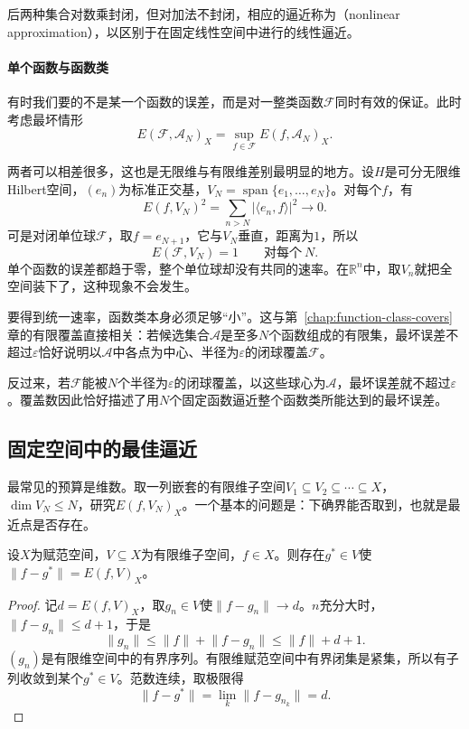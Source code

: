 后两种集合对数乘封闭，但对加法不封闭，相应的逼近称为（nonlinear approximation），以区别于在固定线性空间中进行的线性逼近。

\paragraph{单个函数与函数类}
有时我们要的不是某一个函数的误差，而是对一整类函数$\mathcal F$同时有效的保证。此时考虑最坏情形
\begin{equation}
 E(\mathcal F,\mathcal A_N)_X=\sup_{f\in\mathcal F}E(f,\mathcal A_N)_X .
 \label{eq:fapprox-worst-case}
\end{equation}

两者可以相差很多，这也是无限维与有限维差别最明显的地方。设$H$是可分无限维Hilbert空间，$(e_n)$为标准正交基，$V_N=\operatorname{span}\{e_1,\ldots,e_N\}$。对每个$f$，有
\[
 E(f,V_N)^2=\sum_{n>N}\lvert\langle e_n,f\rangle\rvert^2\to0 .
\]
可是对闭单位球$\mathcal F$，取$f=e_{N+1}$，它与$V_N$垂直，距离为$1$，所以
\[
 E(\mathcal F,V_N)=1\qquad\text{对每个}\ N.
\]
单个函数的误差都趋于零，整个单位球却没有共同的速率。在$\mathbb R^n$中，取$V_n$就把全空间装下了，这种现象不会发生。

要得到统一速率，函数类本身必须足够“小”。这与第~\ref{chap:function-class-covers}章的有限覆盖直接相关：若候选集合$\mathcal A$是至多$N$个函数组成的有限集，最坏误差不超过$\varepsilon$恰好说明以$\mathcal A$中各点为中心、半径为$\varepsilon$的闭球覆盖$\mathcal F$。

反过来，若$\mathcal F$能被$N$个半径为$\varepsilon$的闭球覆盖，以这些球心为$\mathcal A$，最坏误差就不超过$\varepsilon$。覆盖数因此恰好描述了用$N$个固定函数逼近整个函数类所能达到的最坏误差。

\subsection{固定空间中的最佳逼近}
\label{sec:fapprox-fixed-space}

最常见的预算是维数。取一列嵌套的有限维子空间$V_1\subseteq V_2\subseteq\cdots\subseteq X$，$\dim V_N\leq N$，研究$E(f,V_N)_X$。一个基本的问题是：下确界能否取到，也就是最近点是否存在。

\begin{theorem}[有限维子空间中最佳逼近的存在]
\label{thm:fapprox-existence}
设$X$为赋范空间，$V\subseteq X$为有限维子空间，$f\in X$。则存在$g^*\in V$使$\lVert f-g^*\rVert=E(f,V)_X$。
\end{theorem}

\begin{proof}
记$d=E(f,V)_X$，取$g_n\in V$使$\lVert f-g_n\rVert\to d$。$n$充分大时，$\lVert f-g_n\rVert\leq d+1$，于是
\[
 \lVert g_n\rVert\leq\lVert f\rVert+\lVert f-g_n\rVert\leq\lVert f\rVert+d+1 .
\]
$(g_n)$是有限维空间中的有界序列。有限维赋范空间中有界闭集是紧集，所以有子列收敛到某个$g^*\in V$。范数连续，取极限得
\[
 \lVert f-g^*\rVert=\lim_k\lVert f-g_{n_k}\rVert=d .
\]
\end{proof}

